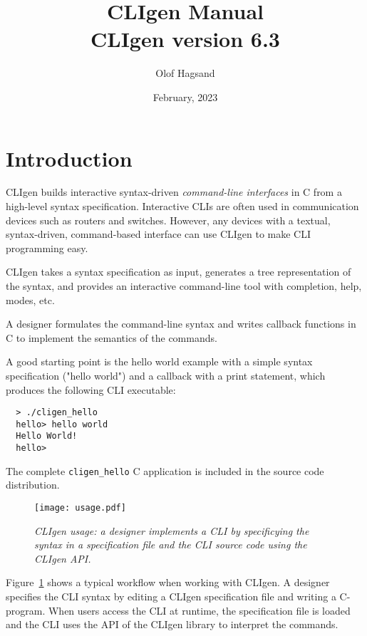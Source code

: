 \documentclass[a4paper, 10pt] {article}
\title {CLIgen Manual\\ {\small CLIgen version 6.3}}
\author{Olof Hagsand}
\begin{document}
\date{February, 2023}
\maketitle
\setcounter{tocdepth}{2}
\tableofcontents
\newpage
\section{Introduction}
\label{sec:intro}

CLIgen builds interactive syntax-driven \emph{command-line interfaces}
in C from a high-level syntax specification. Interactive CLIs are
often used in communication devices such as routers and
switches. However, any devices with a textual, syntax-driven,
command-based interface can use CLIgen to make CLI programming easy.

CLIgen takes a syntax specification as input, generates a tree
representation of the syntax, and provides an interactive command-line
tool with completion, help, modes, etc.

A designer formulates the command-line syntax and writes callback
functions in C to implement the semantics of the commands.

A good starting point is the hello world example with a simple syntax
specification ("hello world") and a callback with a print statement,
which produces the following CLI executable:

\begin{verbatim}
  > ./cligen_hello 
  hello> hello world 
  Hello World!
  hello> 
\end{verbatim}

The complete {\tt cligen\_hello} C application is included in the
source code distribution.

\begin{figure}
\centering
\texttt{[image: usage.pdf]}
\caption{\em CLIgen usage: a designer implements a CLI by specificying the syntax in a specification file and the CLI source code using the CLIgen API.}
\label{fig:usage}
\end{figure}

Figure~\ref{fig:usage} shows a typical workflow when working with
CLIgen. A designer specifies the CLI syntax by editing a CLIgen
specification file and writing a C-program. When users access the CLI
at runtime, the specification file is loaded and the CLI uses the API
of the CLIgen library to interpret the commands.
\end{document}
